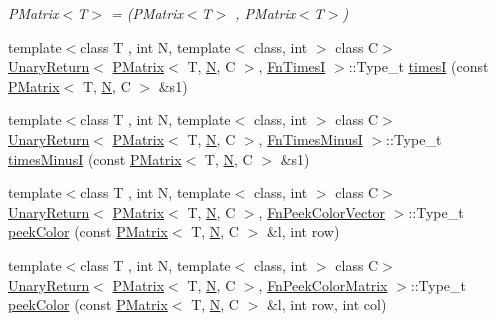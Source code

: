 \begin{DoxyCompactItemize}
\begin{DoxyCompactList}\small\item\em P\+Matrix$<$\+T$>$ = (P\+Matrix$<$\+T$>$ , P\+Matrix$<$\+T$>$) \end{DoxyCompactList}\item 
{\footnotesize template$<$class T , int N, template$<$ class, int $>$ class C$>$ }\\\mbox{\hyperlink{structENSEM_1_1UnaryReturn}{Unary\+Return}}$<$ \mbox{\hyperlink{classENSEM_1_1PMatrix}{P\+Matrix}}$<$ T, \mbox{\hyperlink{operator__name__util_8cc_a7722c8ecbb62d99aee7ce68b1752f337}{N}}, C $>$, \mbox{\hyperlink{structENSEM_1_1FnTimesI}{Fn\+TimesI}} $>$\+::Type\+\_\+t \mbox{\hyperlink{group__primmatrix_ga9f1d3892badcfa2bf78d97c42c8a05e5}{timesI}} (const \mbox{\hyperlink{classENSEM_1_1PMatrix}{P\+Matrix}}$<$ T, \mbox{\hyperlink{operator__name__util_8cc_a7722c8ecbb62d99aee7ce68b1752f337}{N}}, C $>$ \&s1)
\item 
{\footnotesize template$<$class T , int N, template$<$ class, int $>$ class C$>$ }\\\mbox{\hyperlink{structENSEM_1_1UnaryReturn}{Unary\+Return}}$<$ \mbox{\hyperlink{classENSEM_1_1PMatrix}{P\+Matrix}}$<$ T, \mbox{\hyperlink{operator__name__util_8cc_a7722c8ecbb62d99aee7ce68b1752f337}{N}}, C $>$, \mbox{\hyperlink{structENSEM_1_1FnTimesMinusI}{Fn\+Times\+MinusI}} $>$\+::Type\+\_\+t \mbox{\hyperlink{group__primmatrix_ga937a4152dd7d0ceaec303ddbdbaf5a98}{times\+MinusI}} (const \mbox{\hyperlink{classENSEM_1_1PMatrix}{P\+Matrix}}$<$ T, \mbox{\hyperlink{operator__name__util_8cc_a7722c8ecbb62d99aee7ce68b1752f337}{N}}, C $>$ \&s1)
\item 
{\footnotesize template$<$class T , int N, template$<$ class, int $>$ class C$>$ }\\\mbox{\hyperlink{structENSEM_1_1UnaryReturn}{Unary\+Return}}$<$ \mbox{\hyperlink{classENSEM_1_1PMatrix}{P\+Matrix}}$<$ T, \mbox{\hyperlink{operator__name__util_8cc_a7722c8ecbb62d99aee7ce68b1752f337}{N}}, C $>$, \mbox{\hyperlink{structENSEM_1_1FnPeekColorVector}{Fn\+Peek\+Color\+Vector}} $>$\+::Type\+\_\+t \mbox{\hyperlink{group__primmatrix_ga95fe2504ecc461173cb780afe6dbbbf4}{peek\+Color}} (const \mbox{\hyperlink{classENSEM_1_1PMatrix}{P\+Matrix}}$<$ T, \mbox{\hyperlink{operator__name__util_8cc_a7722c8ecbb62d99aee7ce68b1752f337}{N}}, C $>$ \&l, int row)
\item 
{\footnotesize template$<$class T , int N, template$<$ class, int $>$ class C$>$ }\\\mbox{\hyperlink{structENSEM_1_1UnaryReturn}{Unary\+Return}}$<$ \mbox{\hyperlink{classENSEM_1_1PMatrix}{P\+Matrix}}$<$ T, \mbox{\hyperlink{operator__name__util_8cc_a7722c8ecbb62d99aee7ce68b1752f337}{N}}, C $>$, \mbox{\hyperlink{structENSEM_1_1FnPeekColorMatrix}{Fn\+Peek\+Color\+Matrix}} $>$\+::Type\+\_\+t \mbox{\hyperlink{group__primmatrix_gaa9e8d0698d08d9e4b6924a14192c17b4}{peek\+Color}} (const \mbox{\hyperlink{classENSEM_1_1PMatrix}{P\+Matrix}}$<$ T, \mbox{\hyperlink{operator__name__util_8cc_a7722c8ecbb62d99aee7ce68b1752f337}{N}}, C $>$ \&l, int row, int col)

\end{DoxyCompactItemize}
